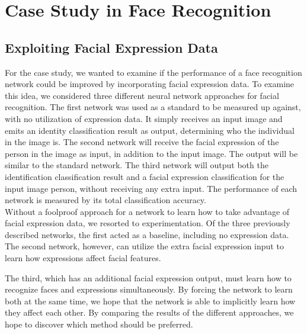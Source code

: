 

\section{Case Study in Face Recognition}



\subsection{Exploiting Facial Expression Data}

For the case study, we wanted to examine if the performance of a face recognition network could be improved by incorporating facial expression data. To examine this idea, we considered three different neural network approaches for facial recognition. The first network was used as a standard to be measured up against, with no utilization of expression data. It simply receives an input image and emits an identity classification result as output, determining who the individual in the image is. The second network will receive the facial expression of the person in the image as input, in addition to the input image. The output will be similar to the standard network. The third network will output both the identification classification result and a facial expression classification for the input image person, without receiving any extra input. The performance of each network is measured by its total classification accuracy. \\

\noindent Without a foolproof approach for a network to learn how to take advantage of facial expression data, we resorted to experimentation. Of the three previously described networks, the first acted as a baseline, including no expression data. The second network, however, can utilize the extra facial expression input to learn how expressions affect facial features.

The third, which has an additional facial expression output, must learn how to recognize faces and expressions simultaneously. By forcing the network to learn both at the same time, we hope that the network is able to implicitly learn how they affect each other. By comparing the results of the different approaches, we hope to discover which method should be preferred. 



